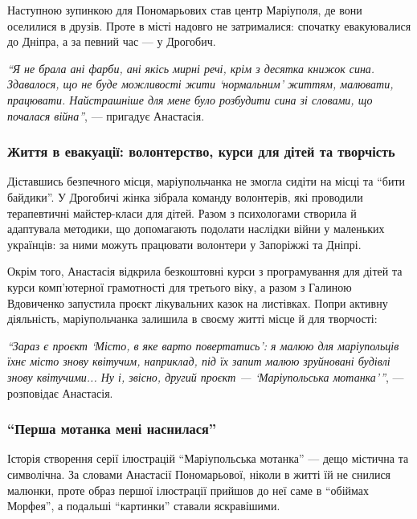 Наступною зупинкою для Пономарьових став центр Маріуполя, де вони оселилися в
друзів. Проте в місті надовго не затрималися: спочатку евакуювалися до Дніпра,
а за певний час — у Дрогобич.

\begin{leftbar}
\emph{\enquote{Я не брала ані фарби, ані якісь мирні речі, крім з десятка книжок сина.
Здавалося, що не буде можливості жити \enquote{нормальним} життям, малювати, працювати.
Найстрашніше для мене було розбудити сина зі словами, що почалася війна}}, —
пригадує Анастасія.
\end{leftbar}

\subsubsection{Життя в евакуації: волонтерство, курси для дітей та творчість}

Діставшись безпечного місця, маріупольчанка не змогла сидіти на місці та \enquote{бити
байдики}. У Дрогобичі жінка зібрала команду волонтерів, які проводили
терапевтичні майстер-класи для дітей. Разом з психологами створила й адаптувала
методики, що допомагають подолати наслідки війни у маленьких українців: за ними
можуть працювати волонтери у Запоріжжі та Дніпрі.

Окрім того, Анастасія відкрила безкоштовні курси з програмування для дітей та
курси комп'ютерної грамотності для третього віку, а разом з Галиною Вдовиченко
запустила проєкт лікувальних казок на листівках. Попри активну діяльність,
маріупольчанка залишила в своєму житті місце й для творчості:

\begin{leftbar}
\emph{\enquote{Зараз є проєкт \enquote{Місто, в яке варто повертатись}: я малюю для маріупольців їхнє
місто знову квітучим, наприклад, під їх запит малюю зруйновані будівлі знову
квітучими... Ну і, звісно, другий проєкт — \enquote{Маріупольська мотанка}}}, — розповідає
Анастасія.
\end{leftbar}


\subsubsection{\enquote{Перша мотанка мені наснилася}}

Історія створення серії ілюстрацій \enquote{Маріупольська мотанка} — дещо містична та
символічна. За словами Анастасії Пономарьової, ніколи в житті їй не снилися
малюнки, проте образ першої ілюстрації прийшов до неї саме в \enquote{обіймах Морфея},
а подальші \enquote{картинки} ставали яскравішими.

